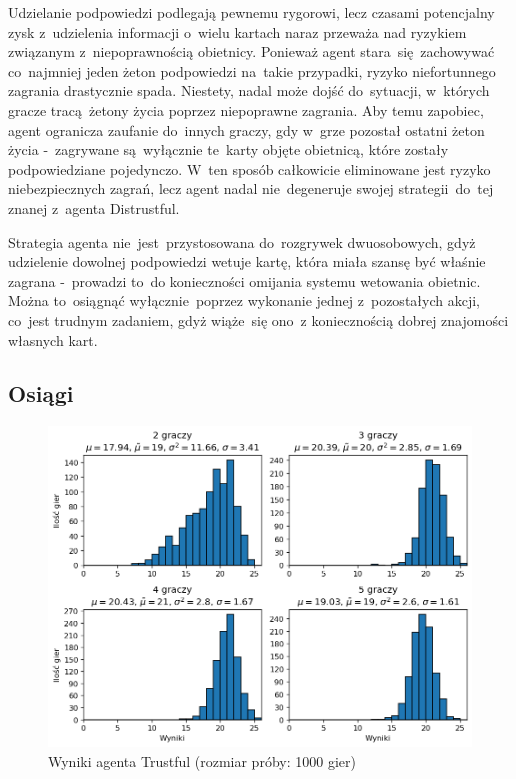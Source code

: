 \documentclass[declaration,shortabstract,inz]{iithesis}
\begin{document}
Udzielanie podpowiedzi podlegają pewnemu rygorowi, lecz czasami potencjalny zysk z~udzielenia informacji o~wielu kartach naraz przeważa nad ryzykiem związanym z~niepoprawnością obietnicy. Ponieważ agent stara~się zachowywać co~najmniej jeden żeton podpowiedzi na~takie przypadki, ryzyko niefortunnego zagrania drastycznie spada. Niestety, nadal może dojść do~sytuacji, w~których gracze tracą żetony życia poprzez niepoprawne zagrania. Aby temu zapobiec, agent ogranicza zaufanie do~innych graczy, gdy w~grze pozostał ostatni żeton życia -~zagrywane są~wyłącznie te~karty objęte obietnicą, które zostały podpowiedziane pojedynczo. W~ten sposób całkowicie eliminowane jest ryzyko niebezpiecznych zagrań, lecz agent nadal nie~degeneruje swojej strategii do~tej znanej z~agenta Distrustful.

Strategia agenta nie~jest~przystosowana do~rozgrywek dwuosobowych, gdyż udzielenie dowolnej podpowiedzi wetuje kartę, która miała szansę być właśnie zagrana -~prowadzi to~do konieczności omijania systemu wetowania obietnic. Można to~osiągnąć wyłącznie poprzez wykonanie jednej z~pozostałych akcji, co~jest trudnym zadaniem, gdyż wiąże~się ono~z koniecznością dobrej znajomości własnych kart.

\subsection*{Osiągi}

\begin{figure}[H]
	\centering
	\captionsetup{format=hang}
	\includegraphics[width=\textwidth,height=\textheight,keepaspectratio]{Trustful.png}
	\caption[Caption]{Wyniki agenta Trustful (rozmiar próby: 1000 gier)}
	\label{fig:Trustful}
\end{figure}
\end{document}
